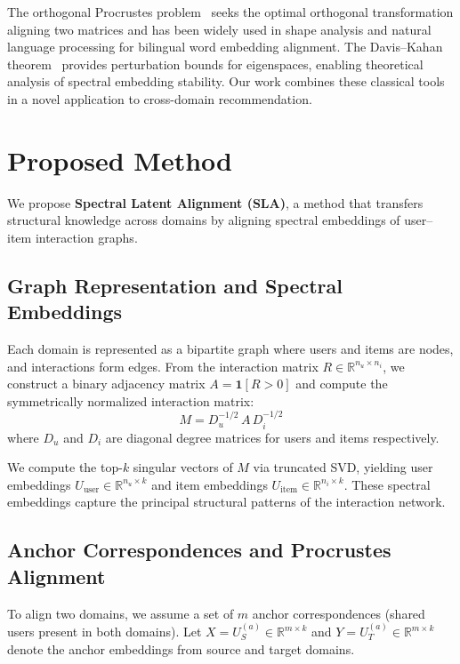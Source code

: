 \documentclass[conference]{IEEEtran}
\begin{document}
The orthogonal Procrustes problem~\cite{schoenemann1966} seeks the optimal orthogonal transformation aligning two matrices and has been widely used in shape analysis and natural language processing for bilingual word embedding alignment. The Davis--Kahan theorem~\cite{davis1970} provides perturbation bounds for eigenspaces, enabling theoretical analysis of spectral embedding stability. Our work combines these classical tools in a novel application to cross-domain recommendation.

\section{Proposed Method}

We propose \textbf{Spectral Latent Alignment (SLA)}, a method that transfers structural knowledge across domains by aligning spectral embeddings of user--item interaction graphs.

\subsection{Graph Representation and Spectral Embeddings}

Each domain is represented as a bipartite graph where users and items are nodes, and interactions form edges. From the interaction matrix $R \in \mathbb{R}^{n_u \times n_i}$, we construct a binary adjacency matrix $A = \mathbf{1}[R > 0]$ and compute the symmetrically normalized interaction matrix:
\begin{equation}
    M = D_u^{-1/2} \, A \, D_i^{-1/2}
\end{equation}
where $D_u$ and $D_i$ are diagonal degree matrices for users and items respectively.

We compute the top-$k$ singular vectors of $M$ via truncated SVD, yielding user embeddings $U_{\text{user}} \in \mathbb{R}^{n_u \times k}$ and item embeddings $U_{\text{item}} \in \mathbb{R}^{n_i \times k}$. These spectral embeddings capture the principal structural patterns of the interaction network.

\subsection{Anchor Correspondences and Procrustes Alignment}

To align two domains, we assume a set of $m$ anchor correspondences (shared users present in both domains). Let $X = U_S^{(a)} \in \mathbb{R}^{m \times k}$ and $Y = U_T^{(a)} \in \mathbb{R}^{m \times k}$ denote the anchor embeddings from source and target domains.
\end{document}
